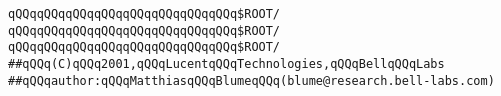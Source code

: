 \verb|qQQqqQQqqQQqqQQqqQQqqQQqqQQqqQQq$ROOT/|\newline
\verb|qQQqqQQqqQQqqQQqqQQqqQQqqQQqqQQq$ROOT/|\newline
\verb|qQQqqQQqqQQqqQQqqQQqqQQqqQQqqQQq$ROOT/|\newline
\newline
\verb|##qQQq(C)qQQq2001,qQQqLucentqQQqTechnologies,qQQqBellqQQqLabs|\newline
\verb|##qQQqauthor:qQQqMatthiasqQQqBlumeqQQq(blume@research.bell-labs.com)|\newline

